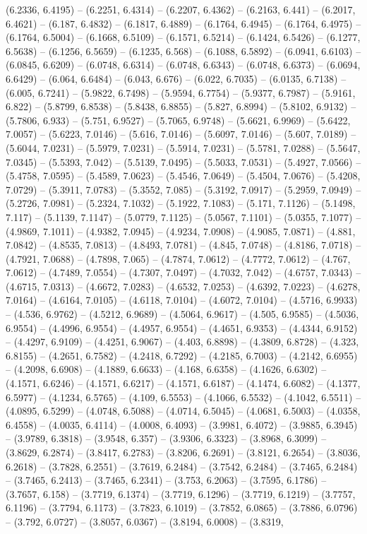 (6.2336, 6.4195) -- (6.2251, 6.4314) -- (6.2207, 6.4362) -- (6.2163, 6.441) -- (6.2017, 6.4621) -- (6.187, 6.4832) -- (6.1817, 6.4889) -- (6.1764, 6.4945) -- (6.1764, 6.4975) -- (6.1764, 6.5004) -- (6.1668, 6.5109) -- (6.1571, 6.5214) -- (6.1424, 6.5426) -- (6.1277, 6.5638) -- (6.1256, 6.5659) -- (6.1235, 6.568) -- (6.1088, 6.5892) -- (6.0941, 6.6103) -- (6.0845, 6.6209) -- (6.0748, 6.6314) -- (6.0748, 6.6343) -- (6.0748, 6.6373) -- (6.0694, 6.6429) -- (6.064, 6.6484) -- (6.043, 6.676) -- (6.022, 6.7035) -- (6.0135, 6.7138) -- (6.005, 6.7241) -- (5.9822, 6.7498) -- (5.9594, 6.7754) -- (5.9377, 6.7987) -- (5.9161, 6.822) -- (5.8799, 6.8538) -- (5.8438, 6.8855) -- (5.827, 6.8994) -- (5.8102, 6.9132) -- (5.7806, 6.933) -- (5.751, 6.9527) -- (5.7065, 6.9748) -- (5.6621, 6.9969) -- (5.6422, 7.0057) -- (5.6223, 7.0146) -- (5.616, 7.0146) -- (5.6097, 7.0146) -- (5.607, 7.0189) -- (5.6044, 7.0231) -- (5.5979, 7.0231) -- (5.5914, 7.0231) -- (5.5781, 7.0288) -- (5.5647, 7.0345) -- (5.5393, 7.042) -- (5.5139, 7.0495) -- (5.5033, 7.0531) -- (5.4927, 7.0566) -- (5.4758, 7.0595) -- (5.4589, 7.0623) -- (5.4546, 7.0649) -- (5.4504, 7.0676) -- (5.4208, 7.0729) -- (5.3911, 7.0783) -- (5.3552, 7.085) -- (5.3192, 7.0917) -- (5.2959, 7.0949) -- (5.2726, 7.0981) -- (5.2324, 7.1032) -- (5.1922, 7.1083) -- (5.171, 7.1126) -- (5.1498, 7.117) -- (5.1139, 7.1147) -- (5.0779, 7.1125) -- (5.0567, 7.1101) -- (5.0355, 7.1077) -- (4.9869, 7.1011) -- (4.9382, 7.0945) -- (4.9234, 7.0908) -- (4.9085, 7.0871) -- (4.881, 7.0842) -- (4.8535, 7.0813) -- (4.8493, 7.0781) -- (4.845, 7.0748) -- (4.8186, 7.0718) -- (4.7921, 7.0688) -- (4.7898, 7.065) -- (4.7874, 7.0612) -- (4.7772, 7.0612) -- (4.767, 7.0612) -- (4.7489, 7.0554) -- (4.7307, 7.0497) -- (4.7032, 7.042) -- (4.6757, 7.0343) -- (4.6715, 7.0313) -- (4.6672, 7.0283) -- (4.6532, 7.0253) -- (4.6392, 7.0223) -- (4.6278, 7.0164) -- (4.6164, 7.0105) -- (4.6118, 7.0104) -- (4.6072, 7.0104) -- (4.5716, 6.9933) -- (4.536, 6.9762) -- (4.5212, 6.9689) -- (4.5064, 6.9617) -- (4.505, 6.9585) -- (4.5036, 6.9554) -- (4.4996, 6.9554) -- (4.4957, 6.9554) -- (4.4651, 6.9353) -- (4.4344, 6.9152) -- (4.4297, 6.9109) -- (4.4251, 6.9067) -- (4.403, 6.8898) -- (4.3809, 6.8728) -- (4.323, 6.8155) -- (4.2651, 6.7582) -- (4.2418, 6.7292) -- (4.2185, 6.7003) -- (4.2142, 6.6955) -- (4.2098, 6.6908) -- (4.1889, 6.6633) -- (4.168, 6.6358) -- (4.1626, 6.6302) -- (4.1571, 6.6246) -- (4.1571, 6.6217) -- (4.1571, 6.6187) -- (4.1474, 6.6082) -- (4.1377, 6.5977) -- (4.1234, 6.5765) -- (4.109, 6.5553) -- (4.1066, 6.5532) -- (4.1042, 6.5511) -- (4.0895, 6.5299) -- (4.0748, 6.5088) -- (4.0714, 6.5045) -- (4.0681, 6.5003) -- (4.0358, 6.4558) -- (4.0035, 6.4114) -- (4.0008, 6.4093) -- (3.9981, 6.4072) -- (3.9885, 6.3945) -- (3.9789, 6.3818) -- (3.9548, 6.357) -- (3.9306, 6.3323) -- (3.8968, 6.3099) -- (3.8629, 6.2874) -- (3.8417, 6.2783) -- (3.8206, 6.2691) -- (3.8121, 6.2654) -- (3.8036, 6.2618) -- (3.7828, 6.2551) -- (3.7619, 6.2484) -- (3.7542, 6.2484) -- (3.7465, 6.2484) -- (3.7465, 6.2413) -- (3.7465, 6.2341) -- (3.753, 6.2063) -- (3.7595, 6.1786) -- (3.7657, 6.158) -- (3.7719, 6.1374) -- (3.7719, 6.1296) -- (3.7719, 6.1219) -- (3.7757, 6.1196) -- (3.7794, 6.1173) -- (3.7823, 6.1019) -- (3.7852, 6.0865) -- (3.7886, 6.0796) -- (3.792, 6.0727) -- (3.8057, 6.0367) -- (3.8194, 6.0008) -- (3.8319, 
